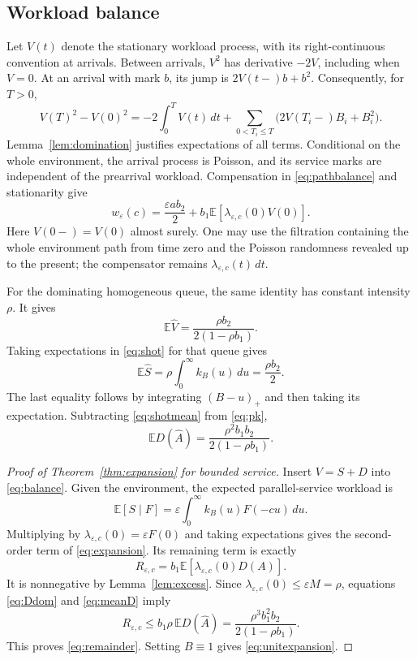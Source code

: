 \documentclass[10pt,a4paper]{amsart}
\numberwithin{equation}{section}
\newcommand{\E}{\mathbb E}
\newcommand{\1}{\mathbf 1}
\newcommand{\eps}{\varepsilon}
\begin{document}
\subsection{Workload balance}
Let $V(t)$ denote the stationary workload process, with its right-continuous convention at arrivals. Between arrivals, $V^2$ has derivative $-2V$, including when $V=0$. At an arrival with mark $b$, its jump is $2V(t-)b+b^2$. Consequently, for $T>0$,
\begin{equation}\label{eq:pathbalance}
 V(T)^2-V(0)^2=-2\int_0^T V(t)\,dt
 +\sum_{0<T_i\le T}\bigl(2V(T_i-)B_i+B_i^2\bigr).
\end{equation}
Lemma~\ref{lem:domination} justifies expectations of all terms. Conditional on the whole environment, the arrival process is Poisson, and its service marks are independent of the prearrival workload. Compensation in \eqref{eq:pathbalance} and stationarity give
\begin{equation}\label{eq:balance}
 w_\eps(c)=\frac{\eps a b_2}{2}+b_1\E[\lambda_{\eps,c}(0)V(0)].
\end{equation}
Here $V(0-)=V(0)$ almost surely. One may use the filtration containing the whole environment path from time zero and the Poisson randomness revealed up to the present; the compensator remains $\lambda_{\eps,c}(t)\,dt$.

For the dominating homogeneous queue, the same identity has constant intensity $\rho$. It gives
\begin{equation}\label{eq:pk}
 \E\widehat V=\frac{\rho b_2}{2(1-\rho b_1)}.
\end{equation}
Taking expectations in \eqref{eq:shot} for that queue gives
\begin{equation}\label{eq:shotmean}
 \E\widehat S=\rho\int_0^\infty k_B(u)\,du=\frac{\rho b_2}{2}.
\end{equation}
The last equality follows by integrating $(B-u)_+$ and then taking its expectation. Subtracting \eqref{eq:shotmean} from \eqref{eq:pk},
\begin{equation}\label{eq:meanD}
 \E D(\widehat A)=\frac{\rho^2 b_1b_2}{2(1-\rho b_1)}.
\end{equation}

\begin{proof}[Proof of Theorem~\ref{thm:expansion} for bounded service]
Insert $V=S+D$ into \eqref{eq:balance}. Given the environment, the expected parallel-service workload is
\[
 \E[S\mid F]=\eps\int_0^\infty k_B(u)F(-cu)\,du.
\]
Multiplying by $\lambda_{\eps,c}(0)=\eps F(0)$ and taking expectations gives the second-order term of \eqref{eq:expansion}. Its remaining term is exactly
\begin{equation}\label{eq:Rexact}
 R_{\eps,c}=b_1\E[\lambda_{\eps,c}(0)D(A)].
\end{equation}
It is nonnegative by Lemma~\ref{lem:excess}. Since $\lambda_{\eps,c}(0)\le\eps M=\rho$, equations \eqref{eq:Ddom} and \eqref{eq:meanD} imply
\[
 R_{\eps,c}\le b_1\rho\,\E D(\widehat A)
 =\frac{\rho^3 b_1^2b_2}{2(1-\rho b_1)}.
\]
This proves \eqref{eq:remainder}. Setting $B\equiv1$ gives \eqref{eq:unitexpansion}.
\end{proof}
\end{document}
